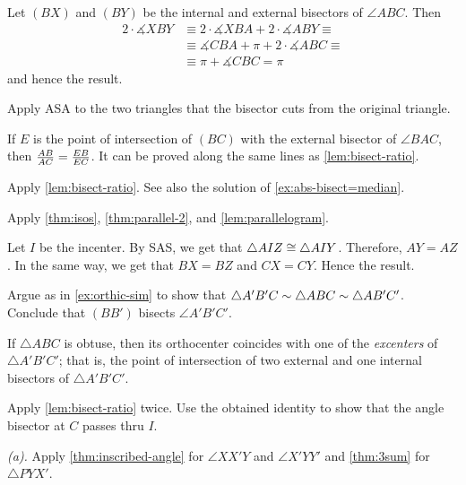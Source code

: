 Let $(BX)$ and $(BY)$ be the internal and external bisectors of $\angle ABC$.
Then 
\begin{align*}
2\cdot \measuredangle XBY&\equiv2\cdot \measuredangle XBA+2\cdot \measuredangle ABY\equiv
\\
&\equiv
\measuredangle CBA+\pi+2\cdot \measuredangle ABC\equiv
\\
&\equiv\pi+\measuredangle CBC=\pi
\end{align*}
and hence the result.

Apply ASA to the two triangles that the bisector cuts from the original triangle. 

If $E$ is the point of intersection of $(BC)$ 
with the external bisector of $\angle BAC$, then 
$\frac{AB}{AC}=\frac{EB}{EC}$.
It can be proved along the same lines as \ref{lem:bisect-ratio}.

Apply \ref{lem:bisect-ratio}.
See also the solution of \ref{ex:abs-bisect=median}.

Apply \ref{thm:isos}, \ref{thm:parallel-2}, and \ref{lem:parallelogram}.

Let $I$ be the incenter.
By SAS, we get that $\triangle AIZ\cong\triangle AIY$.
Therefore, $AY=AZ$.
In the same way, we get that $BX=BZ$ and $CX=CY$.
Hence the result.

Argue as in \ref{ex:orthic-sim} to show that $\triangle A'B'C\sim \triangle ABC\sim\triangle AB'C'$.
Conclude that $(BB')$ bisects $\angle A'B'C'$.

If $\triangle ABC$ is obtuse, then its orthocenter coincides with one of the \emph{excenters} of $\triangle A'B'C'$;
that is, 
the point of intersection of two external and one internal bisectors of $\triangle A'B'C'$.

Apply \ref{lem:bisect-ratio} twice.
Use the obtained identity to show that the angle bisector at $C$ passes thru $I$.

\setcounter{eqtn}{0}

 \textit{(a).}
Apply \ref{thm:inscribed-angle} for $\angle XX'Y$ and $\angle X'YY'$
and \ref{thm:3sum} for $\triangle PYX'$.

